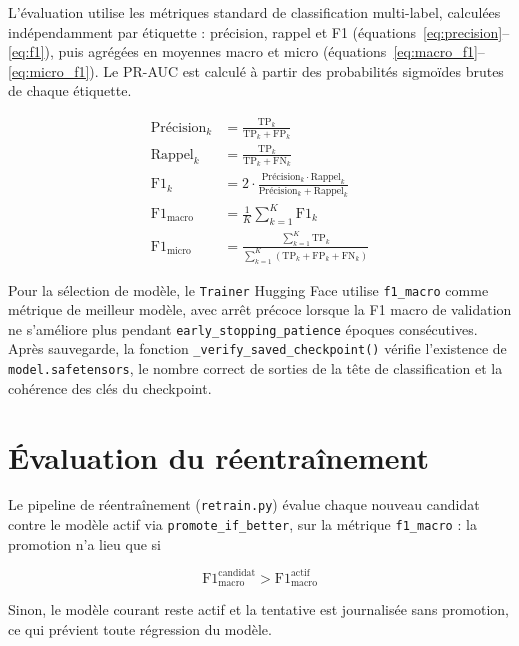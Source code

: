 L'évaluation utilise les métriques standard de classification multi-label, calculées indépendamment par étiquette : précision, rappel et F1 (équations~\ref{eq:precision}--\ref{eq:f1}), puis agrégées en moyennes macro et micro (équations~\ref{eq:macro_f1}--\ref{eq:micro_f1}). Le PR-AUC est calculé à partir des probabilités sigmoïdes brutes de chaque étiquette.

\begin{align}
\text{Précision}_k &= \frac{\text{TP}_k}{\text{TP}_k + \text{FP}_k} \label{eq:precision} \\
\text{Rappel}_k &= \frac{\text{TP}_k}{\text{TP}_k + \text{FN}_k} \label{eq:recall} \\
\text{F1}_k &= 2 \cdot \frac{\text{Précision}_k \cdot \text{Rappel}_k}{\text{Précision}_k + \text{Rappel}_k} \label{eq:f1} \\
\text{F1}_{\text{macro}} &= \frac{1}{K} \sum_{k=1}^{K} \text{F1}_k \label{eq:macro_f1} \\
\text{F1}_{\text{micro}} &= \frac{\sum_{k=1}^{K} \text{TP}_k}{\sum_{k=1}^{K} (\text{TP}_k + \text{FP}_k + \text{FN}_k)} \label{eq:micro_f1}
\end{align}

Pour la sélection de modèle, le \texttt{Trainer} Hugging Face utilise \texttt{f1\_macro} comme métrique de meilleur modèle, avec arrêt précoce lorsque la F1 macro de validation ne s'améliore plus pendant \texttt{early\_stopping\_patience} époques consécutives. Après sauvegarde, la fonction \texttt{\_verify\_saved\_checkpoint()} vérifie l'existence de \texttt{model.safetensors}, le nombre correct de sorties de la tête de classification et la cohérence des clés du checkpoint.

\section{Évaluation du réentraînement}

Le pipeline de réentraînement (\texttt{retrain.py}) évalue chaque nouveau candidat contre le modèle actif via \texttt{promote\_if\_better}, sur la métrique \texttt{f1\_macro} : la promotion n'a lieu que si

\begin{equation}
\text{F1}_{\text{macro}}^{\text{candidat}} > \text{F1}_{\text{macro}}^{\text{actif}}
\end{equation}

Sinon, le modèle courant reste actif et la tentative est journalisée sans promotion, ce qui prévient toute régression du modèle.
